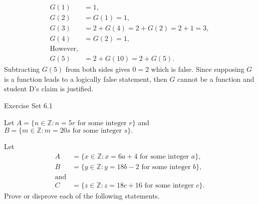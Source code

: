 \documentclass[12pt,letterpaper, onecolumn]{exam}
\begin{document}
\begin{questions}
\begin{solution}
		\begin{align*}
			G(1)&=1,\\
			G(2)&=G(1)=1,\\
			G(3)&=2+G(4)=2+G(2)=2+1=3,\\
			G(4)&=G(2)=1,\\
		\text{However,}\\
			G(5)&=2+G(10)=2+G(5).
		\end{align*}
		Subtracting $G(5)$ from both sides gives $0=2$ which is false. Since supposing $G$ is a function leads to a logically false statement, then $G$ cannot be a function and student D's claim is justified.
	\end{solution} 
	\end{questions}
	
	\centerline{Exercise Set 6.1}
	\begin{questions}
	\setcounter{question}{3}\question Let $A=\{n\in\mathbb{Z}:n=5r \text{ for some integer }r\}$ and $B=\{m\in\mathbb{Z}:m=20s \text{ for some integer } s\}.$
	\begin{solution}
	\end{solution}
	\setcounter{question}{6} \question  
	Let \begin{align*}
		A&=\{x\in\mathbb{Z}:x=6a+4 \text{ for some integer } a\},\\
		B&=\{y\in\mathbb{Z}:y=18b-2\text{ for some integer } b\},\\
		\text{and}\\
		C&=\{z\in\mathbb{Z}:z=18c+16\text{ for some integer }c\}.
	\end{align*}
	Prove or disprove each of the following statements.
	\begin{parts}

\end{parts}
\end{questions}
\end{document}
